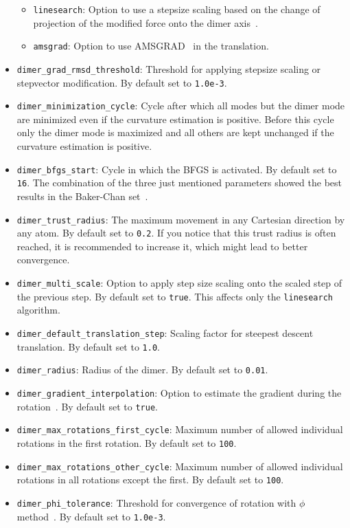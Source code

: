 \documentclass[]{tufte-book}
\begin{document}
\begin{itemize}
\begin{itemize}
\item \texttt{linesearch}: Option to use a stepsize scaling based on the change of projection of the modified force onto the dimer axis~\cite{dimer2}.
\item \texttt{amsgrad}: Option to use AMSGRAD~\cite{amsgrad} in the translation.
\end{itemize}
\item \texttt{dimer\_grad\_rmsd\_threshold}: Threshold for applying stepsize scaling or stepvector modification. By default set to \texttt{1.0e-3}.
\item \texttt{dimer\_minimization\_cycle}: Cycle after which all modes but the dimer mode are minimized even if the curvature estimation is positive. Before this cycle only the dimer mode is maximized and all others are kept unchanged if the curvature estimation is positive.
\item \texttt{dimer\_bfgs\_start}: Cycle in which the BFGS is activated. By default set to \texttt{16}.
The combination of the three just mentioned parameters showed the best results in the Baker-Chan set~\cite{baker-chan}.
\item \texttt{dimer\_trust\_radius}: The maximum movement in any Cartesian direction by any atom. By default set to \texttt{0.2}. If you notice that this trust radius is often reached, it is recommended to increase it, which might lead to better convergence.
\item \texttt{dimer\_multi\_scale}: Option to apply step size scaling onto the scaled step of the previous step. By default set to \texttt{true}. This affects only the \texttt{linesearch} algorithm.
\item \texttt{dimer\_default\_translation\_step}: Scaling factor for steepest descent translation. By default set to \texttt{1.0}.
\item \texttt{dimer\_radius}: Radius of the dimer. By default set to \texttt{0.01}.
\item \texttt{dimer\_gradient\_interpolation}: Option to estimate the gradient during the rotation~\cite{dimer2}. By default set to \texttt{true}.
\item \texttt{dimer\_max\_rotations\_first\_cycle}: Maximum number of allowed individual rotations in the first rotation. By default set to \texttt{100}.
\item \texttt{dimer\_max\_rotations\_other\_cycle}: Maximum number of allowed individual rotations in all rotations except the first. By default set to \texttt{100}.
\item \texttt{dimer\_phi\_tolerance}: Threshold for convergence of rotation with $\phi$ method~\cite{dimer2}. By default set to \texttt{1.0e-3}.

\end{itemize}
\end{document}
